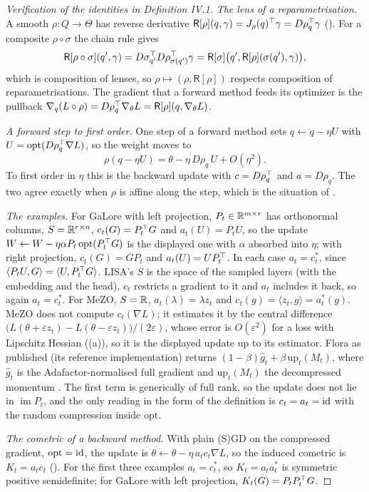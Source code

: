 \begin{proof}[Verification of the identities in Definition IV.1]
\emph{The lens of a reparametrisation.} A smooth $\rho:Q\to\Theta$ has reverse derivative
$\mathsf R[\rho](q,\gamma)=J_\rho(q)^{\top}\gamma=D\rho_q^{\top}\gamma$ (). For a composite $\rho\circ\sigma$ the chain rule
gives
\[\mathsf R[\rho\circ\sigma](q',\gamma)=D\sigma_{q'}^{\top} D\rho_{\sigma(q')}^{\top}\gamma=\mathsf R[\sigma]\big(q',\mathsf R[\rho](\sigma(q'),\gamma)\big),\]
which is composition of lenses, so $\rho\mapsto(\rho,\mathsf R[\rho])$ respects composition of reparametrisations. The
gradient that a forward method feeds its optimizer is the pullback $\nabla_q(L\circ\rho)=D\rho_q^{\top}\nabla_\theta L=
\mathsf R[\rho](q,\nabla_\theta L)$.

\emph{A forward step to first order.} One step of a forward method sets $q\leftarrow q-\eta U$ with
$U=\mathrm{opt}(D\rho_q^{\top}\nabla L)$, so the weight moves to
\[\rho(q-\eta U)=\theta-\eta\,D\rho_q\,U+O(\eta^2).\]
To first order in $\eta$ this is the backward update with $c=D\rho_q^{\top}$ and $a=D\rho_q$. The two agree exactly when $\rho$ is
affine along the step, which is the situation of .

\emph{The examples.} For GaLore with left projection, $P_t\in\mathbb{R}^{m\times r}$ has orthonormal columns,
$S=\mathbb{R}^{r\times n}$, $c_t(G)=P_t^{\top} G$ and $a_t(U)=P_tU$, so the update $W\leftarrow W-\eta\alpha P_t\,\mathrm{opt}(P_t^{\top} G)$ is
the displayed one with $\alpha$ absorbed into $\eta$; with right projection, $c_t(G)=GP_t$ and $a_t(U)=UP_t^{\top}$. In each case
$a_t=c_t^*$, since $\langle P_tU,G\rangle=\langle U,P_t^{\top} G\rangle$. LISA's $S$ is the space of the sampled layers (with the
embedding and the head), $c_t$ restricts a gradient to it and $a_t$ includes it back, so again $a_t=c_t^*$. For MeZO,
$S=\mathbb{R}$, $a_t(\lambda)=\lambda z_t$ and $c_t(g)=\langle z_t,g\rangle=a_t^*(g)$. MeZO does not compute $c_t(\nabla L)$; it
estimates it by the central difference $\big(L(\theta+\varepsilon z_t)-L(\theta-\varepsilon z_t)\big)/(2\varepsilon)$,
whose error is $O(\varepsilon^2)$ for a loss with Lipschitz Hessian ((a)), so it is the displayed update up to
its estimator. Flora as published (its reference implementation) returns $(1-\beta)\hat g_t+\beta\,\mathrm{up}_t(M_t)$, where $\hat g_t$ is the
Adafactor-normalised full gradient and $\mathrm{up}_t(M_t)$ the decompressed momentum \citep{hao2024flora}. The first term
is generically of full rank, so the update does not lie in $\operatorname{im}P_t$, and the only reading in the form of the
definition is $c_t=a_t=\mathrm{id}$ with the random compression inside $\mathrm{opt}$.

\emph{The cometric of a backward method.} With plain (S)GD on the compressed gradient, $\mathrm{opt}=\mathrm{id}$, the update is
$\theta\leftarrow\theta-\eta\,a_tc_t\nabla L$, so the induced cometric is $K_t=a_tc_t$ (). For the
first three examples $a_t=c_t^*$, so $K_t=a_ta_t^*$ is symmetric positive semidefinite; for GaLore with left projection,
$K_t(G)=P_tP_t^{\top} G$.
\end{proof}

